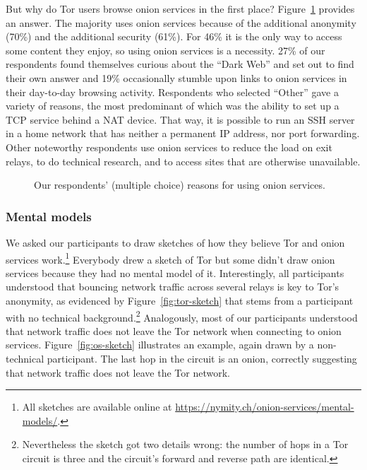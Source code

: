 But why do Tor users browse onion services in the first place?
Figure~\ref{fig:onion-usage} provides an answer.  The majority uses onion
services because of the additional anonymity (70\%) and the additional security
(61\%).  For 46\% it is the only way to access some content they enjoy, so using
onion services is a necessity.  27\% of our respondents found themselves curious
about the ``Dark Web'' and set out to find their own answer and 19\%
occasionally stumble upon links to onion services in their day-to-day browsing
activity.  Respondents who selected ``Other'' gave a variety of reasons, the
most predominant of which was the ability to set up a TCP service behind a NAT
device.  That way, it is possible to run an SSH server in a home network that
has neither a permanent IP address, nor port forwarding.  Other noteworthy
respondents use onion services to reduce the load on exit relays, to do
technical research, and to access sites that are otherwise unavailable.

\begin{figure}[t]
    \centering
    
    \caption{Our respondents' (multiple choice) reasons for using onion
    services.}
    \label{fig:onion-usage}
\end{figure}

\subsubsection{Mental models}

We asked our participants to draw sketches of how they believe Tor and onion
services work.\footnote{All sketches are available online at
\url{https://nymity.ch/onion-services/mental-models/}.}   Everybody drew a
sketch of Tor but some didn't draw onion services because they had no mental
model of it.  Interestingly, all participants understood that bouncing network
traffic across several relays is key to Tor's anonymity, as evidenced by
Figure~\ref{fig:tor-sketch} that stems from a participant with no technical
background.\footnote{Nevertheless the sketch got two details wrong: the number
of hops in a Tor circuit is three and the circuit's forward and reverse path are
identical.}  Analogously, most of our participants understood that network
traffic does not leave the Tor network when connecting to onion services.
Figure~\ref{fig:os-sketch} illustrates an example, again drawn by a
non-technical participant.  The last hop in the circuit is an onion, correctly
suggesting that network traffic does not leave the Tor network.

